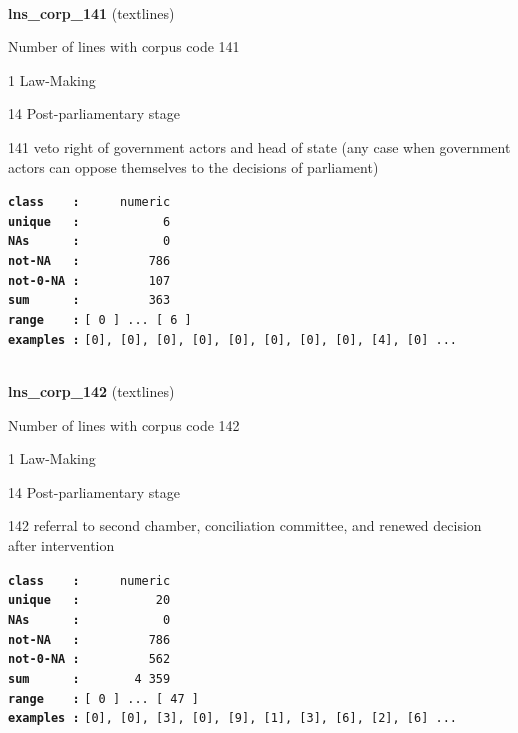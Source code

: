 \documentclass[]{article}
\begin{document}
~

\textbf{lns\_corp\_141} (textlines)

Number of lines with corpus code 141

1 Law-Making

14 Post-parliamentary stage

141 veto right of government actors and head of state (any case when
government actors can oppose themselves to the decisions of parliament)

\textbf{\texttt{class\ \ \ \ :}} \texttt{~~~~~numeric}\\
\textbf{\texttt{unique\ \ \ :}} \texttt{~~~~~~~~~~~6}\\
\textbf{\texttt{NAs\ \ \ \ \ \ :}} \texttt{~~~~~~~~~~~0}\\
\textbf{\texttt{not-NA\ \ \ :}} \texttt{~~~~~~~~~786}\\
\textbf{\texttt{not-0-NA\ :}} \texttt{~~~~~~~~~107}\\
\textbf{\texttt{sum\ \ \ \ \ \ :}} \texttt{~~~~~~~~~363}\\
\textbf{\texttt{range\ \ \ \ :}}
\texttt{{[}\ 0\ {]}\ ...\ {[}\ 6\ {]}}\\
\textbf{\texttt{examples\ :}}
\texttt{{[}0{]},\ {[}0{]},\ {[}0{]},\ {[}0{]},\ {[}0{]},\ {[}0{]},\ {[}0{]},\ {[}0{]},\ {[}4{]},\ {[}0{]}\ ...}\\

~

\textbf{lns\_corp\_142} (textlines)

Number of lines with corpus code 142

1 Law-Making

14 Post-parliamentary stage

142 referral to second chamber, conciliation committee, and renewed
decision after intervention

\textbf{\texttt{class\ \ \ \ :}} \texttt{~~~~~numeric}\\
\textbf{\texttt{unique\ \ \ :}} \texttt{~~~~~~~~~~20}\\
\textbf{\texttt{NAs\ \ \ \ \ \ :}} \texttt{~~~~~~~~~~~0}\\
\textbf{\texttt{not-NA\ \ \ :}} \texttt{~~~~~~~~~786}\\
\textbf{\texttt{not-0-NA\ :}} \texttt{~~~~~~~~~562}\\
\textbf{\texttt{sum\ \ \ \ \ \ :}} \texttt{~~~~~~~4~359}\\
\textbf{\texttt{range\ \ \ \ :}}
\texttt{{[}\ 0\ {]}\ ...\ {[}\ 47\ {]}}\\
\textbf{\texttt{examples\ :}}
\texttt{{[}0{]},\ {[}0{]},\ {[}3{]},\ {[}0{]},\ {[}9{]},\ {[}1{]},\ {[}3{]},\ {[}6{]},\ {[}2{]},\ {[}6{]}\ ...}\\
\end{document}
